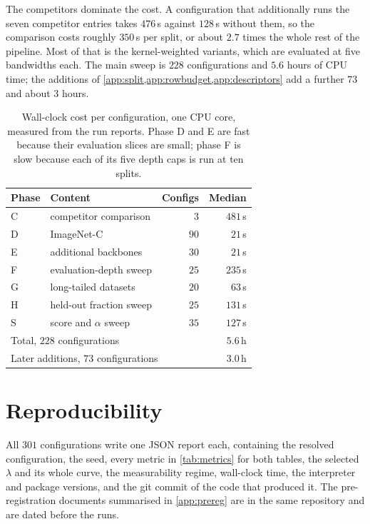 The competitors dominate the cost. A configuration that additionally runs the seven competitor
entries takes $476$\,s against $128$\,s without them, so the comparison costs roughly $350$\,s
per split, or about $2.7$ times the whole rest of the pipeline. Most of that is the
kernel-weighted variants, which are evaluated at five bandwidths each. The main sweep is $228$ configurations and
$5.6$ hours of CPU time; the additions of \cref{app:split,app:rowbudget,app:descriptors} add
a further $73$ and about $3$ hours.

\begin{table}[h]
\centering
\small
\setlength{\tabcolsep}{4pt}
\begin{tabular}{llrr}
\toprule
Phase & Content & Configs & Median \\
\midrule
C & competitor comparison    & $3$  & $481$\,s \\
D & ImageNet-C               & $90$ & $21$\,s \\
E & additional backbones     & $30$ & $21$\,s \\
F & evaluation-depth sweep   & $25$ & $235$\,s \\
G & long-tailed datasets     & $20$ & $63$\,s \\
H & held-out fraction sweep  & $25$ & $131$\,s \\
S & score and $\alpha$ sweep & $35$ & $127$\,s \\
\midrule
\multicolumn{3}{l}{Total, $228$ configurations} & $5.6$\,h \\
\multicolumn{3}{l}{Later additions, $73$ configurations} & $3.0$\,h \\
\bottomrule
\end{tabular}
\caption{Wall-clock cost per configuration, one CPU core, measured from the run reports. Phase D
and E are fast because their evaluation slices are small; phase F is slow because each of its
five depth caps is run at ten splits.}
\label{tab:runtime}
\end{table}

\section{Reproducibility}
\label{app:repro}

All $301$ configurations write one JSON report each, containing the resolved configuration,
the seed, every metric in \cref{tab:metrics} for both tables, the selected $\lambda$ and its
whole curve, the measurability regime, wall-clock time, the interpreter and package versions,
and the git commit of the code that produced it. The pre-registration documents summarised in
\cref{app:prereg} are in the same repository and are dated before the runs.

